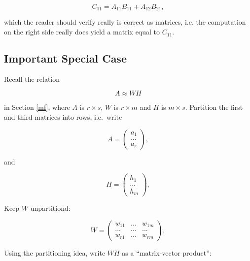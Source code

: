 \begin{equation}
C_{11} = A_{11} B_{11} + A_{12} B_{21}, 
\end{equation}

which the reader should verify really is correct as matrices, i.e. the
computation on the right side really does yield a matrix equal to $C_{11}$.

\subsection{Important Special Case}

Recall the relation 

\begin{equation}
A \approx WH
\end{equation}

in Section \ref{mf}, where $A$ is $r \times s$, $W$ is $r \times m$ and
$H$ is $m \times s$.  Partition the first and third  matrices into rows, i.e.\
write


\begin{equation}
A =
\left (
\begin{array}{c}
a_1 \\
... \\
a_r 
\end{array}
\right ),
\end{equation}

and

\begin{equation}
H =
\left (
\begin{array}{c}
h_1 \\
... \\
h_m 
\end{array}
\right ),
\end{equation}

Keep $W$ unpartitiond:

\begin{equation}
W = 
\left (
\begin{array}{ccc}
w_{11} & ... & w_{1m}\\
... & ... & ... \\
w_{r1} & ... & w_{rm}
\end{array}
\right ),
\end{equation}

Using the partitioning idea, write $WH$ as a ``matrix-vector product'':

